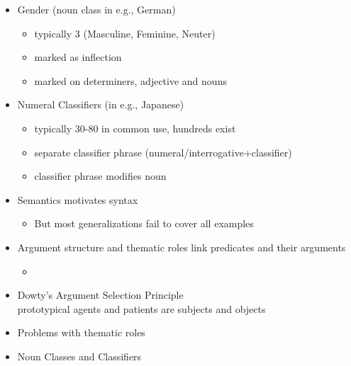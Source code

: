 \documentclass[headrule,footrule]{foils}
\begin{document}
\begin{itemize}
\item Gender (noun class in e.g., German)
  \begin{itemize}
  \item typically 3 (Masculine, Feminine, Neuter)
  \item marked as inflection
  \item marked on determiners, adjective and nouns
  \end{itemize}
\item Numeral Classifiers (in e.g., Japanese)
  \begin{itemize}
  \item typically 30-80 in common use, hundreds exist
  \item separate classifier phrase (numeral/interrogative+classifier)
  \item classifier phrase modifies noun
  \end{itemize}
\end{itemize}

\MyLogo{}
\begin{itemize}
\item  Semantics motivates syntax
  \begin{itemize}
  \item  But most generalizations fail to cover all examples
  \end{itemize}
\item Argument structure and thematic roles link predicates and their arguments
  \begin{itemize}
  \item {}
  \end{itemize}
\item Dowty's Argument Selection Principle
  \\ prototypical agents and patients are subjects and objects 
\item Problems with thematic roles
\item Noun Classes and Classifiers
\end{itemize}
\end{document}
